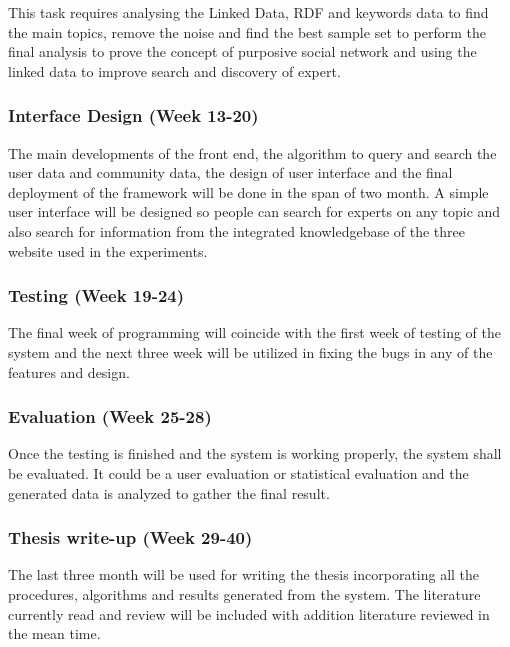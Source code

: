 This task requires analysing the Linked Data, RDF and keywords data to find the main topics, remove the noise and find the best sample set to perform the final analysis to prove the concept of purposive social network and using the linked data to improve search and discovery of expert.

\subsubsection{Interface Design (Week 13-20)}

The main developments of the front end, the algorithm to query and search the user data and community data, the design of user interface and the final deployment of the framework will be done in the span of two month. A simple user interface will be designed so people can search for experts on any topic and also search for information from the integrated knowledgebase of the three website used in the experiments.

\subsubsection{Testing (Week 19-24)}

The final week of programming will coincide with the first week of testing of the system and the next three week will be utilized in fixing the bugs in any of the features and design.

\subsubsection{Evaluation (Week 25-28)}

Once the testing is finished and the system is working properly, the system shall be evaluated. It could be a user evaluation or statistical evaluation and the generated data is analyzed to gather the final result.

\subsubsection{Thesis write-up (Week 29-40)}

The last three month will be used for writing the thesis incorporating all the procedures, algorithms and results generated from the system. The literature currently read and review will be included with addition literature reviewed in the mean time.